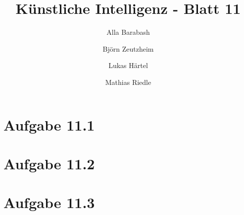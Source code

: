 \documentclass[german,a4paper]{scrartcl}
\title{Künstliche Intelligenz - Blatt 11}
\author{Alla Barabash \and Björn Zeutzheim \and Lukas Härtel \and Mathias Riedle}
\date{}
\begin{document}
	\maketitle
	\section*{Aufgabe 11.1}
	
	
	\section*{Aufgabe 11.2}
	
	
	\section*{Aufgabe 11.3}
	
\end{document}

